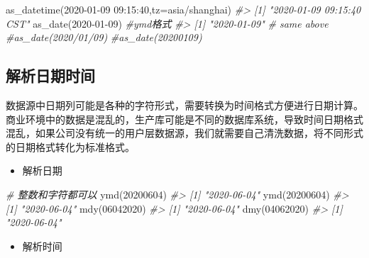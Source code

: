 \documentclass[
]{book}
\newenvironment{Shaded}{\begin{snugshade}}{\end{snugshade}}
\newcommand{\AttributeTok}[1]{\textcolor[rgb]{0.77,0.63,0.00}{#1}}
\newcommand{\CommentTok}[1]{\textcolor[rgb]{0.56,0.35,0.01}{\textit{#1}}}
\newcommand{\DecValTok}[1]{\textcolor[rgb]{0.00,0.00,0.81}{#1}}
\newcommand{\FunctionTok}[1]{\textcolor[rgb]{0.00,0.00,0.00}{#1}}
\newcommand{\NormalTok}[1]{#1}
\newcommand{\StringTok}[1]{\textcolor[rgb]{0.31,0.60,0.02}{#1}}
\providecommand{\tightlist}{%
  \setlength{\itemsep}{0pt}\setlength{\parskip}{0pt}}
\begin{document}
\begin{Shaded}
\begin{Highlighting}[]
\FunctionTok{as\_datetime}\NormalTok{(}\StringTok{\textquotesingle{}2020{-}01{-}09 09:15:40\textquotesingle{}}\NormalTok{,}\AttributeTok{tz=}\StringTok{\textquotesingle{}asia/shanghai\textquotesingle{}}\NormalTok{)}
\CommentTok{\#\textgreater{} [1] "2020{-}01{-}09 09:15:40 CST"}
\FunctionTok{as\_date}\NormalTok{(}\StringTok{\textquotesingle{}2020{-}01{-}09\textquotesingle{}}\NormalTok{) }\CommentTok{\#ymd格式}
\CommentTok{\#\textgreater{} [1] "2020{-}01{-}09"}
\CommentTok{\# same above}
\CommentTok{\#as\_date(\textquotesingle{}2020/01/09\textquotesingle{})}
\CommentTok{\#as\_date(\textquotesingle{}20200109\textquotesingle{})}
\end{Highlighting}
\end{Shaded}

\hypertarget{parse-datetime}{%
\subsection{解析日期时间}\label{parse-datetime}}

数据源中日期列可能是各种的字符形式，需要转换为时间格式方便进行日期计算。商业环境中的数据是混乱的，生产库可能是不同的数据库系统，导致时间日期格式混乱，如果公司没有统一的用户层数据源，我们就需要自己清洗数据，将不同形式的日期格式转化为标准格式。

\begin{itemize}
\tightlist
\item
  解析日期
\end{itemize}

\begin{Shaded}
\begin{Highlighting}[]
\CommentTok{\# 整数和字符都可以}
\FunctionTok{ymd}\NormalTok{(}\DecValTok{20200604}\NormalTok{) }
\CommentTok{\#\textgreater{} [1] "2020{-}06{-}04"}
\FunctionTok{ymd}\NormalTok{(}\StringTok{\textquotesingle{}20200604\textquotesingle{}}\NormalTok{)}
\CommentTok{\#\textgreater{} [1] "2020{-}06{-}04"}
\FunctionTok{mdy}\NormalTok{(}\DecValTok{06042020}\NormalTok{)}
\CommentTok{\#\textgreater{} [1] "2020{-}06{-}04"}
\FunctionTok{dmy}\NormalTok{(}\DecValTok{04062020}\NormalTok{)}
\CommentTok{\#\textgreater{} [1] "2020{-}06{-}04"}
\end{Highlighting}
\end{Shaded}

\begin{itemize}
\tightlist
\item
  解析时间
\end{itemize}
\end{document}

